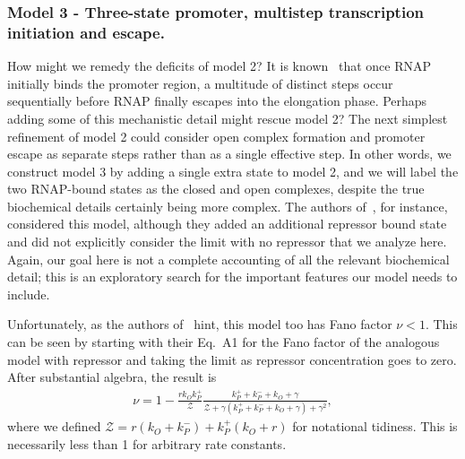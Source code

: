 \subsubsection{Model 3 - Three-state promoter, multistep transcription
initiation and escape.} How might we remedy the deficits of model 2? It is
known~\cite{DeHaseth1998} that once RNAP initially binds the promoter region, a
multitude of distinct steps occur sequentially before RNAP finally escapes into
the elongation phase. Perhaps adding some of this mechanistic detail might
rescue model 2? The next simplest refinement of model 2 could consider open
complex formation and promoter escape as separate steps rather than as a single
effective step. In other words, we construct model 3 by adding a single extra
state to model 2, and we will label the two RNAP-bound states as the closed and
open complexes, despite the true biochemical details certainly being more
complex. The authors of~\cite{Mitarai2015}, for instance, considered this model,
although they added an additional repressor bound state and did not explicitly
consider the limit with no repressor that we analyze here. Again, our goal here
is not a complete accounting of all the relevant biochemical detail; this is an
exploratory search for the important features our model needs to include.

Unfortunately, as the authors of~\cite{Mitarai2015} hint, this model too has
Fano factor $\nu<1$. This can be seen by starting with their Eq.~A1 for the Fano
factor of the analogous model with repressor and taking the limit as repressor
concentration goes to zero. After substantial algebra, the result is
\begin{align}
\nu = 1 - \frac{r k_O k_P^+}{\mathcal{Z}}
\frac{k_P^+ + k_P^- + k_O + \gamma}
        {\mathcal{Z} + \gamma(k_P^+ + k_P^- + k_O + \gamma) + \gamma^2},
\end{align}
where we defined $\mathcal{Z} = r(k_O + k_P^-) + k_P^+(k_O + r)$ for notational
tidiness. This is necessarily less than 1 for arbitrary rate constants.


